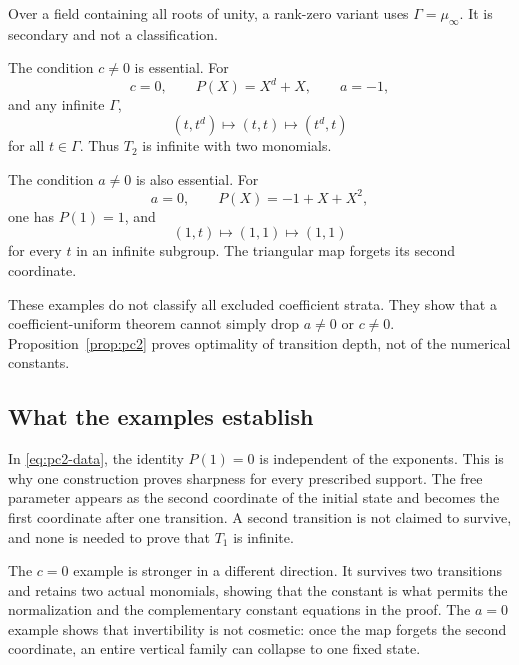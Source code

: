 \documentclass[11pt]{article}
\theoremstyle{definition}
\begin{document}
Over a field containing all roots of unity, a rank-zero variant uses \(\Gamma=\mu_\infty\). It is secondary and not a classification.

The condition \(c\neq0\) is essential. For
\begin{equation}
 c=0,\qquad P(X)=X^d+X,\qquad a=-1,
 \label{eq:c-zero-data}
\end{equation}
and any infinite \(\Gamma\),
\begin{equation}
 (t,t^d)\longmapsto(t,t)\longmapsto(t^d,t)
 \label{eq:c-zero-orbit}
\end{equation}
for all \(t\in\Gamma\). Thus \(T_2\) is infinite with two monomials.

The condition \(a\neq0\) is also essential. For
\begin{equation}
 a=0,\qquad P(X)=-1+X+X^2,
 \label{eq:a-zero-data}
\end{equation}
one has \(P(1)=1\), and
\begin{equation}
 (1,t)\longmapsto(1,1)\longmapsto(1,1)
 \label{eq:a-zero-orbit}
\end{equation}
for every \(t\) in an infinite subgroup. The triangular map forgets its second coordinate.

These examples do not classify all excluded coefficient strata. They show that a coefficient-uniform theorem cannot simply drop \(a\neq0\) or \(c\neq0\). Proposition~\ref{prop:pc2} proves optimality of transition depth, not of the numerical constants.


\subsection{What the examples establish}

In \eqref{eq:pc2-data}, the identity \(P(1)=0\) is independent of the exponents. This is why one construction proves sharpness for every prescribed support. The free parameter appears as the second coordinate of the initial state and becomes the first coordinate after one transition. A second transition is not claimed to survive, and none is needed to prove that \(T_1\) is infinite.

The \(c=0\) example is stronger in a different direction. It survives two transitions and retains two actual monomials, showing that the constant is what permits the normalization and the complementary constant equations in the proof. The \(a=0\) example shows that invertibility is not cosmetic: once the map forgets the second coordinate, an entire vertical family can collapse to one fixed state.
\end{document}
